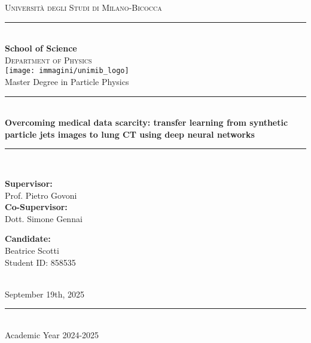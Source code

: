 \begin{titlepage}
    \newcommand{\HRule}{\rule{\linewidth}{0.2mm}}
    \center
    \textsc{\LARGE Università degli Studi di Milano-Bicocca}\\[10pt]
    \HRule \\[15pt]
    {\bf \large \sc School of Science} \\[10pt]
    \textsc{\Large Department of Physics}\\[15pt]
    \texttt{[image: immagini/unimib\_logo]}\\[20pt]
    {\Large Master Degree in Particle Physics}\\[30pt]
    \HRule\\[15pt]
    {\huge \bf Overcoming medical data scarcity: transfer learning from synthetic particle jets images to lung CT using deep neural networks}\\[10pt]
    \HRule\\[20pt]
    \begin{minipage}[t]{10cm}
        {\Large{\bf Supervisor:}\\[5pt] Prof. Pietro Govoni}\\
        {\Large{\bf Co-Supervisor:}\\[5pt] Dott. Simone Gennai}
    \end{minipage}\hfill
    \begin{minipage}[t]{5cm}\raggedleft
        {\Large{\bf Candidate:}\\[3pt] Beatrice Scotti\\Student ID: 858535 }
    \end{minipage} \\[10pt]
    \large September 19th, 2025\\
    \HRule \\[5pt]
    \LARGE Academic Year 2024-2025
    \vfill
    \end{titlepage}
    
    \tableofcontents
    \newpage
    